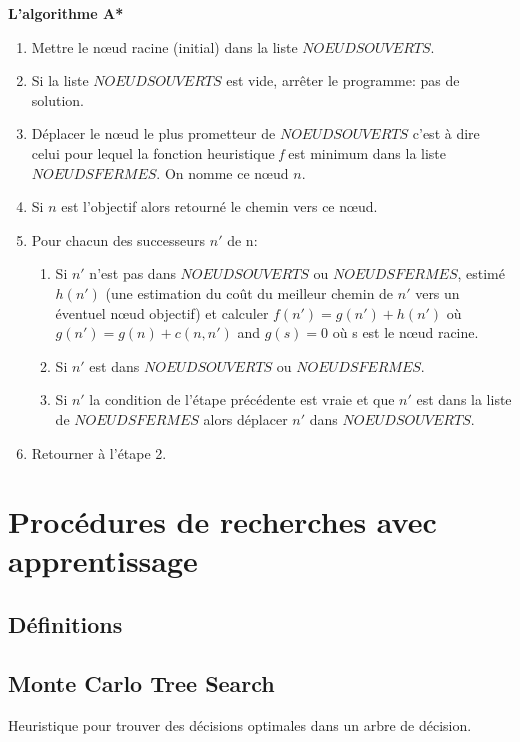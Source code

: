 \textbf{L'algorithme A*\cite{description-a*}}
\begin{enumerate}
\item Mettre le nœud racine (initial) dans la liste $NOEUDS OUVERTS$.
\item Si la liste $NOEUDS OUVERTS$ est vide, arrêter le programme: pas de solution.
\item Déplacer le nœud le plus prometteur de $NOEUDS OUVERTS$ c'est à dire celui pour lequel la fonction heuristique \textit{f} est minimum dans la liste $NOEUDS FERMES$. On nomme ce nœud $n$.
\item Si $n$ est l'objectif alors retourné le chemin vers ce nœud.
\item  Pour chacun des successeurs $n'$ de n:
    \begin{enumerate}
    \item Si $n'$ n'est pas dans $NOEUDS OUVERTS$ ou $NOEUDS FERMES$, estimé $h(n')$ (une estimation du coût du meilleur chemin de $n'$ vers un éventuel nœud objectif) et calculer $f(n') = g(n') + h(n')$ où $g(n') = g(n) + c(n, n')$ and $g(s) = 0$ où s est le nœud racine.
    \item Si $n'$ est dans $NOEUDS OUVERTS$ ou  $NOEUDS FERMES$. 
    \item Si $n'$ la condition de l'étape précédente est vraie et que $n'$ est dans la liste de $NOEUDS FERMES$ alors déplacer $n'$ dans $NOEUDS OUVERTS$.
    \end{enumerate}
\item Retourner à l'étape 2. 
\end{enumerate}



\section{Procédures de recherches avec apprentissage}


\subsection{Définitions}

\subsection{Monte Carlo Tree Search}
Heuristique pour trouver des décisions optimales dans un arbre de décision.

